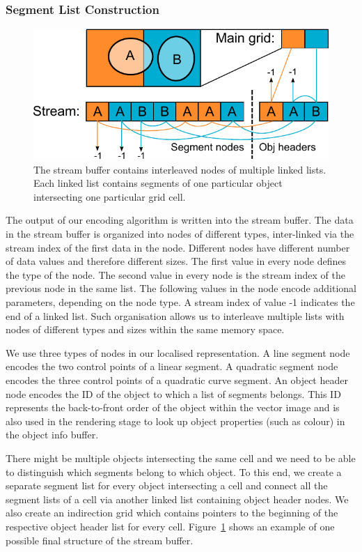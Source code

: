 \documentclass[11pt,a4paper,twoside]{article}
\begin{document}
\subsubsection {Segment List Construction}

\begin {figure} 
	\centering
	\includegraphics[width=0.6\columnwidth] {figures/obj_stream}
	\caption {The stream buffer contains interleaved nodes of multiple linked lists. Each linked list contains segments of one particular object intersecting one particular grid cell.}
	\label {fig:obj_stream}
\end {figure}

The output of our encoding algorithm is written into the stream buffer. The data in the stream buffer is organized into nodes of different types, inter-linked via the stream index of the first data in the node. Different nodes have different number of data values and therefore different sizes. The first value in every node defines the type of the node. The second value in every node is the stream index of the previous node in the same list. The following values in the node encode additional parameters, depending on the node type. A stream index of value -1 indicates the end of a linked list. Such organisation allows us to interleave multiple lists with nodes of different types and sizes within the same memory space.

We use three types of nodes in our localised representation. A line segment node encodes the two control points of a linear segment. A quadratic segment node encodes the three control points of a quadratic curve segment. An object header node encodes the ID of the object to which a list of segments belongs. This ID represents the back-to-front order of the object within the vector image and is also used in the rendering stage to look up object properties (such as colour) in the object info buffer.

There might be multiple objects intersecting the same cell and we need to be able to distinguish which segments belong to which object. To this end, we create a separate segment list for every object intersecting a cell and connect all the segment lists of a cell via another linked list containing object header nodes. We also create an indirection grid which contains pointers to the beginning of the respective object header list for every cell. Figure~\ref{fig:obj_stream} shows an example of one possible final structure of the stream buffer.
\end{document}
